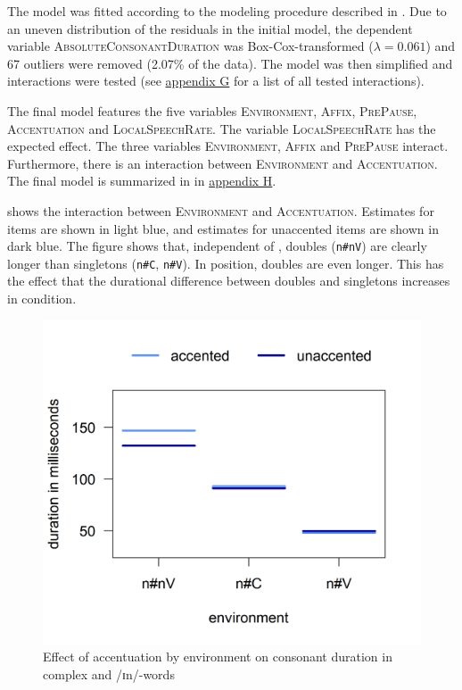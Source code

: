  The model was fitted according to the modeling procedure described in . Due to an uneven distribution of the residuals in the initial model, the dependent variable \textsc{AbsoluteConsonantDuration} was Box-Cox-transformed ($\lambda = 0.061$) and 67 outliers were removed (2.07\% of the data).
The model was then simplified and interactions were tested (see \hyperref[Appendix G Summaries of tested interactions in experimental study]{appendix G} for a list of all tested interactions).


The final model features the five variables \textsc{Environment}, \textsc{Affix}, \textsc{PrePause}, \textsc{Accentuation} and \textsc{LocalSpeechRate}. The variable \textsc{LocalSpeechRate} has the expected effect. The three variables \textsc{Environment}, \textsc{Affix} and \textsc{PrePause} interact. Furthermore, there is an interaction between \textsc{Environment} and \textsc{Accentuation}. The final model is summarized in  in \hyperref[Appendix H: Model Summaries Experiment]{appendix H}.


 shows the interaction between \textsc{Environment} and \textsc{Accentuation}. Estimates for  items are shown in light blue, and estimates  for unaccented items are shown in dark blue. The figure shows that, independent of , doubles (\texttt{n\#nV}) are clearly longer than singletons (\texttt{n\#C}, \texttt{n\#V}). In  position, doubles are even longer. This has the effect that the durational difference between doubles and singletons increases in  condition.



\begin{figure}
	
	\includegraphics [scale=0.5] {images/Experiment/UnInInterEnvAcc}
	\caption{Effect of accentuation by environment on consonant duration in complex  and /ɪn/-words}
	\label{fig: Un In experiment Env and accent}
\end{figure}

